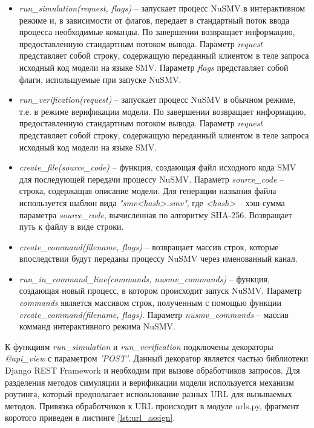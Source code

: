 \begin{itemize}
	\item \textit{run\_simulation(request, flags)} -- запускает процесс NuSMV в интерактивном режиме и, в зависимости от флагов, передает в стандартный поток ввода процесса необходимые команды. По завершении возвращает информацию, предоставленную стандартным потоком вывода. Параметр \textit{request} представляет собой строку, содержащую переданный клиентом в теле запроса исходный код модели на языке SMV. Параметр \textit{flags} представляет собой флаги, испольщуемые при запуске NuSMV.
	\item \textit{run\_verification(request)} -- запускает процесс NuSMV в обычном режиме, т.е. в режиме верификации модели. По завершении возвращает информацию, предоставленную стандартным потоком вывода. Параметр \textit{request} представляет собой строку, содержащую переданный клиентом в теле запроса исходный код модели на языке SMV. 
	\item \textit{create\_file(source\_code)} -- функция, создающая файл исходного кода SMV для последующей передачи процессу NuSMV. Параметр \textit{source\_code} -- строка, содержащая описание модели. Для генерации названия файла используется шаблон вида \textit{"smv<hash>.smv"}, где \textit{<hash>} -- хэш-сумма параметра \textit{source\_code}, вычисленная по алгоритму SHA-256. Возвращает путь к файлу в виде строки.
	\item \textit{create\_command(filename, flags)} -- возвращает массив строк, которые впоследствии будут переданы процессу NuSMV через именованный канал.
	\item \textit{run\_in\_command\_line(commands, nusmv\_commands)} -- функция, создающая новый процесс, в котором происходит запуск NuSMV. Параметр \textit{commands} является массивом строк, полученным с помощью функции \textit{create\_command(filename, flags)}. Параметр \textit{nusmv\_commands} -- массив комманд интерактивного режима NuSMV.
\end{itemize}

К функциям \textit{run\_simulation} и \textit{run\_verification} подключены декораторы \textit{@api\_view} с параметром \textit{'POST'}. Данный декоратор является частью библиотеки Django REST Framework и необходим при вызове обработчиков запросов. Для разделения методов симуляции и верификации модели используется механизм роутинга, который предполагает использование разных URL для вызываемых методов. Привязка обработчиков к URL происходит в модуле urls.py, фрагмент коротого приведен в листинге \ref{lst:url_assign}.

